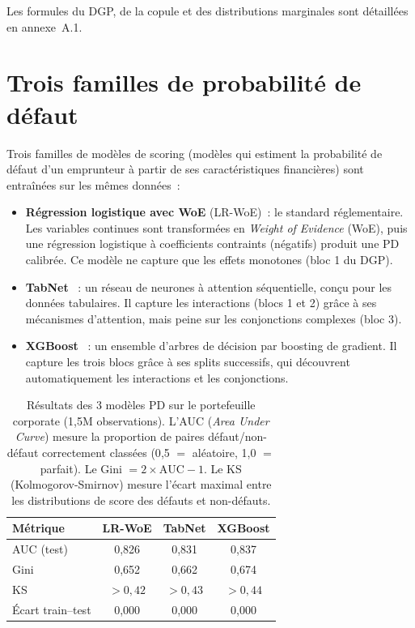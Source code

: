 \documentclass[10pt, a4paper, oneside]{report}
\theoremstyle{definition}
\begin{document}
Les formules du DGP, de la copule et des distributions marginales sont détaillées en annexe~A.1.


\section{Trois familles de probabilité de défaut}
\label{sec:ch1:pd}

Trois familles de modèles de scoring (modèles qui estiment la probabilité de défaut d'un emprunteur à partir de ses caractéristiques financières) sont entraînées sur les mêmes données~:

\begin{itemize}[nosep]
  \item \textbf{Régression logistique avec WoE} (LR-WoE)~: le standard réglementaire. Les variables continues sont transformées en \emph{Weight of Evidence} (WoE), puis une régression logistique à coefficients contraints (négatifs) produit une PD calibrée. Ce modèle ne capture que les effets monotones (bloc 1 du DGP).
  \item \textbf{TabNet} \citep{arik_pfister2021}~: un réseau de neurones à attention séquentielle, conçu pour les données tabulaires. Il capture les interactions (blocs 1 et 2) grâce à ses mécanismes d'attention, mais peine sur les conjonctions complexes (bloc 3).
  \item \textbf{XGBoost} \citep{chen_guestrin2016}~: un ensemble d'arbres de décision par boosting de gradient. Il capture les trois blocs grâce à ses splits successifs, qui découvrent automatiquement les interactions et les conjonctions.
\end{itemize}

\begin{table}[htbp]
\centering
\caption{Résultats des 3 modèles PD sur le portefeuille corporate (1{,}5M observations). L'AUC (\emph{Area Under Curve}) mesure la proportion de paires défaut/non-défaut correctement classées (0{,}5 $=$ aléatoire, 1{,}0 $=$ parfait). Le Gini $= 2 \times \text{AUC} - 1$. Le KS (Kolmogorov-Smirnov) mesure l'écart maximal entre les distributions de score des défauts et non-défauts.}
\label{tab:resultats-corporate}
\begin{tabular}{lccc}
\toprule
Métrique & LR-WoE & TabNet & XGBoost \\
\midrule
AUC (test) & 0{,}826 & 0{,}831 & 0{,}837 \\
Gini & 0{,}652 & 0{,}662 & 0{,}674 \\
KS & $> 0{,}42$ & $> 0{,}43$ & $> 0{,}44$ \\
Écart train--test & 0{,}000 & 0{,}000 & 0{,}000 \\
\bottomrule
\end{tabular}
\end{table}
\end{document}
